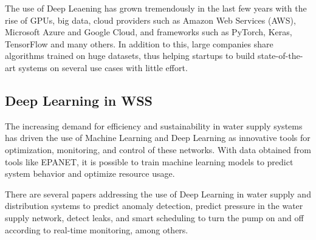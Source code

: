 The use of Deep Leaening has grown tremendously in the last few years with the rise of GPUs, big data, cloud providers such as Amazon Web Services (AWS), Microsoft Azure and Google Cloud, and frameworks such as PyTorch, Keras, TensorFlow and many others. In addition to this, large companies share algorithms trained on huge datasets, thus helping startups to build state-of-the-art systems on several use cases with little effort.\cite{rfc23}


\subsection{Deep Learning in WSS}


\begin{comment}
A crescente demanda por eficiência e sustentabilidade nos sistemas de abastecimento de água tem impulsionado o uso de Machine Learning (ML) e Deep Learning (DL) como ferramentas inovadoras para otimização, monitoramento e controle dessas redes. Com os dados obtidos por ferramentas como EPANET, é possível treinar modelos de aprendizado de máquina para prever o comportamento do sistema e otimizar o uso de recursos.

Há diversos papers abordando o uso de Deep Learning em sistemas de abastecimento e distribuição de água para prever detecção de anomalias\cite{rfc12}, prever pressão na rede de suprimento de água\cite{rfc11}, detecção de vazamentos\cite{rfc13}, agendamento inteligente para ligar e desligar a bomba, de acordo com o monitoramento em tempo real\cite{rfc9} entre outros.
    
\end{comment}





The increasing demand for efficiency and sustainability in water supply systems has driven the use of Machine Learning and Deep Learning as innovative tools for optimization, monitoring, and control of these networks. With data obtained from tools like EPANET, it is possible to train machine learning models to predict system behavior and optimize resource usage.

There are several papers addressing the use of Deep Learning in water supply and distribution systems to predict anomaly detection\cite{rfc12}, predict pressure in the water supply network\cite{rfc11}, detect leaks\cite{rfc13}, and smart scheduling to turn the pump on and off according to real-time monitoring\cite{rfc9}, among others.


